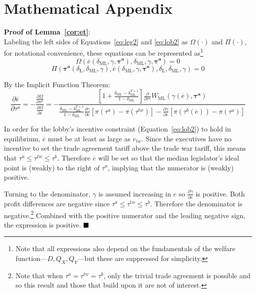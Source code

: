\documentclass[authoryear, review]{elsarticle}
\newcommand{\ov}{\overline}
\newcommand{\bta}{\bm{\tau^a}}
\newcommand{\ga}{\gamma}
\newcommand{\de}{\delta}
\begin{document}
\section{Mathematical Appendix}
\noindent \textbf{\hypertarget{Cor_et}{Proof of Lemma~\ref{cor:et}}}: \\
Labeling the left sides of Equations~\ref{eq:leg2} and \ref{eq:lob2} as $\Omega\left(\cdot\right)$ and $\Pi\left(\cdot\right)$, for notational convenience, these equations can be represented as\footnote{Note that all expressions also depend on the fundamentals of the welfare function---$D,Q_X,Q_Y$---but these are suppressed for simplicity.}
\begin{equation}
  \Omega\left(\ov{e}\left(\de_\text{ML},\ga,\bta \right),\de_\text{ML},\ga,\bta \right) = 0
	\label{eq:leg3}
\end{equation}
\begin{equation}
  \Pi\left(\bta\left(\de_\text{L},\de_\text{ML},\ga\right),\ov{e}\left(\de_\text{ML},\ga,\bta\right),\de_\text{L},\de_\text{ML},\ga \right) = 0
  \label{eq:lob3}
\end{equation}


By the Implicit Function Theorem:
\begin{equation}
 	\frac{\partial \ov{e}}{\partial \tau^a} = -\frac{\frac{\partial \Omega}{\partial \tau^a}}{\frac{\partial \Omega}{\partial \ov{e}}} = -
	\textstyle \frac{\left[1+ \frac{\de_\text{ML} - \de_\text{ML}^{T+1}}{1-\de_\text{ML}}  \right]\frac{\partial}{\partial \tau^a}W_\text{ML}(\ga(\ov{e}),\bta)} {\frac{\de_\text{ML} - \de_\text{ML}^{T+1}}{1-\de_\text{ML}}\frac{\partial \ga}{\partial \ov{e}}\left[ \pi(\tau^a) - \pi(\tau^{tw}) \right] - \frac{\partial \ga}{\partial \ov{e}}\left[ \pi(\tau^b(\ov{e})) - \pi(\tau^{a}) \right]}
	\label{eq:coret}
\end{equation}

\noindent In order for the lobby's incentive constraint (Equation~\ref{eq:lob2}) to hold in equilibrium, $\ov{e}$ must be at least as large as $e_{tw}$. Since the executives have no incentive to set the trade agreement tariff above the trade war tariff, this means that $\tau^a \leq \tau^{tw} \leq \tau^b$. Therefore $\ov{e}$ will be set so that the median legislator's ideal point is (weakly) to the right of $\tau^a$, implying that the numerator is (weakly) positive.

Turning to the denominator, $\ga$ is assumed increasing in $e$ so $\frac{\partial \ga}{\partial \ov{e}}$ is positive. Both profit differences are negative since $\tau^a \leq \tau^{tw} \leq \tau^b$. Therefore the denominator is negative.\footnote{Note that when $\tau^a = \tau^{tw} = \tau^b$, only the trivial trade agreement is possible and so this result and those that build upon it are not of interest.} Combined with the positive numerator and the leading negative sign, the expression is positive. $\hfill\blacksquare$
\end{document}
